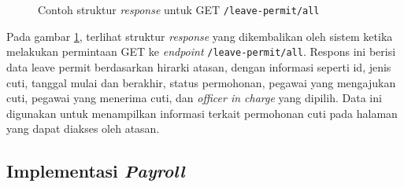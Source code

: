 \begin{figure}
    \centering
    \caption{Contoh struktur \textit{response} untuk GET \texttt{/leave-permit/all}}
    \label{fig:response_leave_permit_all_get}
\end{figure}
Pada gambar \ref{fig:response_leave_permit_all_get}, terlihat struktur \textit{response} yang dikembalikan oleh sistem ketika melakukan permintaan GET ke \textit{endpoint} \texttt{/leave-permit/all}. Respons ini berisi data leave permit berdasarkan hirarki atasan, dengan informasi seperti id, jenis cuti, tanggal mulai dan berakhir, status permohonan, pegawai yang mengajukan cuti, pegawai yang menerima cuti, dan \textit{officer in charge} yang dipilih. Data ini digunakan untuk menampilkan informasi terkait permohonan cuti pada halaman yang dapat diakses oleh atasan.

\subsection{Implementasi \textit{Payroll}}
